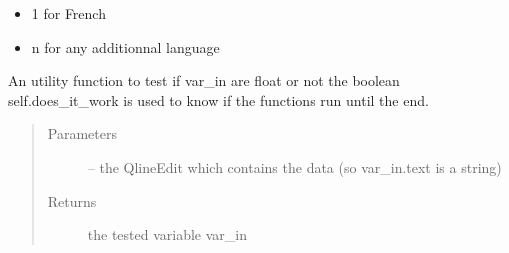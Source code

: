 \documentclass[letterpaper,10pt,english]{sphinxmanual}
\begin{document}
\begin{fulllineitems}
\begin{fulllineitems}
\begin{itemize}
\item {} 
1 for French

\item {} 
n for any additionnal language

\end{itemize}

\end{fulllineitems}


\begin{fulllineitems}
\label{\detokenize{index:src_GUI.Main_windows_1.MainWindows.test_entry_float}}
An utility function to test if var\_in are float or not
the boolean self.does\_it\_work is used to know if the functions run until the end.
\begin{quote}\begin{description}
\item[{Parameters}] \leavevmode
{} -- the QlineEdit which contains the data (so var\_in.text is a string)

\item[{Returns}] \leavevmode
the tested variable var\_in

\end{description}\end{quote}

\end{fulllineitems}


\end{fulllineitems}

\end{document}

